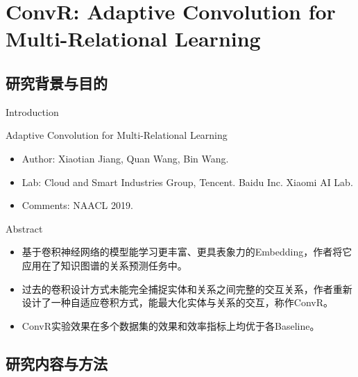 \section{ConvR: Adaptive Convolution for Multi-Relational Learning}
\subsection{研究背景与目的}

\begin{frame}[c]{Introduction}

\begin{block}{Adaptive Convolution for Multi-Relational Learning}
	\begin{itemize}
	    \item Author: Xiaotian Jiang, Quan Wang, Bin Wang.
	    \item Lab: Cloud and Smart Industries Group, Tencent. Baidu Inc. Xiaomi AI Lab.
	    \item Comments: NAACL 2019.
	\end{itemize}
\end{block}

\begin{block}{Abstract}
	\begin{itemize}
	    \item 基于卷积神经网络的模型能学习更丰富、更具表象力的Embedding，作者将它应用在了知识图谱的关系预测任务中。
	    \item 过去的卷积设计方式未能完全捕捉实体和关系之间完整的交互关系，作者重新设计了一种自适应卷积方式，能最大化实体与关系的交互，称作ConvR。
	    \item ConvR实验效果在多个数据集的效果和效率指标上均优于各Baseline。
	\end{itemize}
\end{block}

\end{frame}

\subsection{研究内容与方法}


